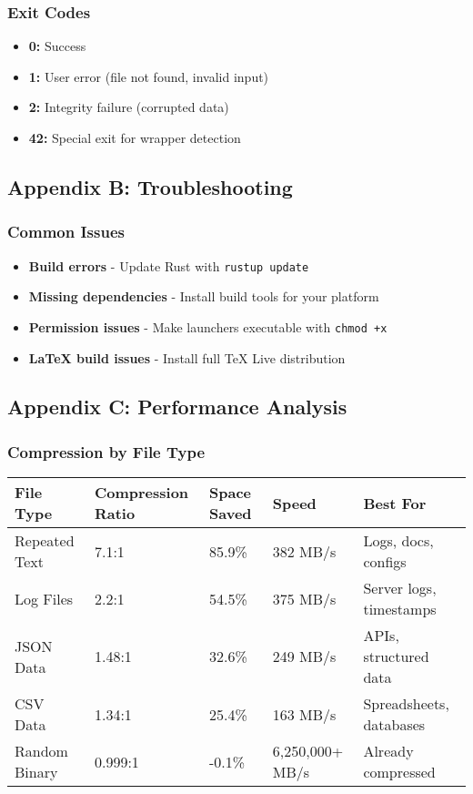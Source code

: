 \documentclass[11pt,a4paper]{article}
\begin{document}
	\subsubsection{Exit Codes}
	\begin{itemize}
		\item \textbf{0:} Success
		\item \textbf{1:} User error (file not found, invalid input)
		\item \textbf{2:} Integrity failure (corrupted data)
		\item \textbf{42:} Special exit for wrapper detection
	\end{itemize}

	\subsection{Appendix B: Troubleshooting}

	\subsubsection{Common Issues}
	\begin{itemize}
		\item \textbf{Build errors} - Update Rust with \texttt{rustup update}
		\item \textbf{Missing dependencies} - Install build tools for your platform
		\item \textbf{Permission issues} - Make launchers executable with \texttt{chmod +x}
		\item \textbf{LaTeX build issues} - Install full TeX Live distribution
	\end{itemize}

	\subsection{Appendix C: Performance Analysis}

	\subsubsection{Compression by File Type}
	\begin{center}
	\begin{tabular}{@{}lllll@{}}
	\toprule
	\textbf{File Type} & \textbf{Compression Ratio} & \textbf{Space Saved} & \textbf{Speed} & \textbf{Best For} \\
	\midrule
	Repeated Text & 7.1:1 & 85.9\% & 382 MB/s & Logs, docs, configs \\
	Log Files & 2.2:1 & 54.5\% & 375 MB/s & Server logs, timestamps \\
	JSON Data & 1.48:1 & 32.6\% & 249 MB/s & APIs, structured data \\
	CSV Data & 1.34:1 & 25.4\% & 163 MB/s & Spreadsheets, databases \\
	Random Binary & 0.999:1 & -0.1\% & 6,250,000+ MB/s & Already compressed \\
	\bottomrule
	\end{tabular}
	\end{center}
\end{document}
